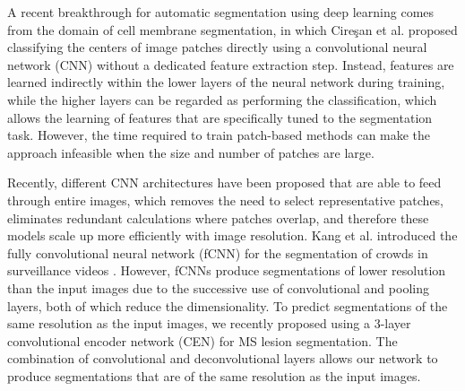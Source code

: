 A recent breakthrough for automatic segmentation using deep learning comes from
the domain of cell membrane segmentation, in which Cire\c{s}an et al.
\cite{Ciresan2012} proposed classifying the centers of image patches directly
using a convolutional neural network (CNN) \cite{LeCun1998} without a dedicated
feature extraction step. Instead, features are learned indirectly within the
lower layers of the neural network during training, while the higher layers can
be regarded as performing the classification, which allows the learning of
features that are specifically tuned to the segmentation task. However, the time
required to train patch-based methods can make the approach infeasible when the
size and number of patches are large.



Recently, different CNN architectures
\cite{long2015,ronneberger2015,brosch2015,kang2014fully} have been proposed that
are able to feed through entire images, which removes the need to select
representative patches, eliminates redundant calculations where patches overlap,
and therefore these models scale up more efficiently with image resolution. Kang
et al. introduced the fully convolutional neural network (fCNN) for the
segmentation of crowds in surveillance videos \cite{kang2014fully}. However, fCNNs produce
segmentations of lower resolution than the input images due to the successive
use of convolutional and pooling layers, both of which reduce the
dimensionality.
To predict segmentations of the same resolution as the input images, we recently
proposed using a 3-layer convolutional encoder network (CEN) \cite{brosch2015}
for MS lesion segmentation. The combination of convolutional \cite{LeCun1998}
and deconvolutional \cite{zeiler2011} layers allows our network to produce
segmentations that are of the same resolution as the input images.

